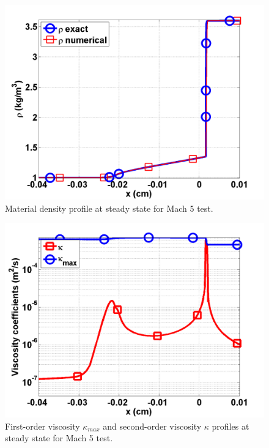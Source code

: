 \begin{figure}[H]
                \centering
                \includegraphics[width=\textwidth]{figures/Mach_5_nel_2000_density.png}
        \caption{Material density profile at steady state for Mach 5 test.}\label{fig:Mach5_density}
\end{figure}
\begin{figure}[H]
                \centering
                \includegraphics[width=\textwidth]{figures/Mach_5_nel_2000_viscosity.png}
        \caption{First-order viscosity $\kappa_{max}$ and second-order viscosity $\kappa$ profiles at steady state for Mach 5 test.}\label{fig:Mach5_viscosity}
\end{figure}

